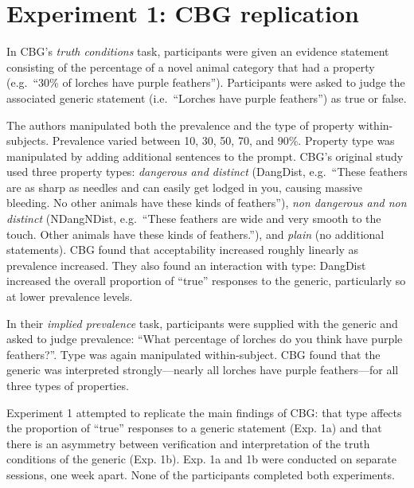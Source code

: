 \documentclass[10pt,letterpaper]{article}
\begin{document}
\section{Experiment 1: CBG replication}

In CBG's \emph{truth conditions} task, participants were given an evidence statement consisting of the percentage of a novel animal category that had a property (e.g.~``30\% of lorches have purple feathers''). Participants were asked to judge the associated generic statement (i.e.~``Lorches have purple feathers'') as true or false. 

The authors manipulated both the prevalence and the type of property within-subjects. Prevalence varied between 10, 30, 50, 70, and 90\%. Property type was manipulated by adding additional sentences to the prompt. CBG's original study used three property types: \emph{dangerous and distinct} (DangDist, e.g.~``These feathers are as sharp as needles and can easily get lodged in you, causing massive bleeding. No other animals have these kinds of feathers''), \emph{non dangerous and non distinct} (NDangNDist, e.g.~``These feathers are wide and very smooth to the touch. Other animals have these kinds of feathers.''), and \emph{plain} (no additional statements). CBG found that acceptability increased roughly linearly as prevalence increased. They also found an interaction with type: DangDist increased the overall proportion of ``true'' responses to the generic, particularly so at lower prevalence levels. 

In their \emph{implied prevalence} task, participants were supplied with the generic and asked to judge prevalence: ``What percentage of lorches do you think have purple feathers?''. Type was again manipulated within-subject. CBG found that the generic was interpreted strongly---nearly all lorches have purple feathers---for all three types of properties.

Experiment 1 attempted to replicate the main findings of CBG: that type affects the proportion of ``true'' responses to a generic statement (Exp. 1a) and that there is an asymmetry between verification and interpretation of the truth conditions of the generic (Exp. 1b). 
Exp. 1a and 1b were conducted on separate sessions, one week apart. None of the participants completed both experiments.
\end{document}

